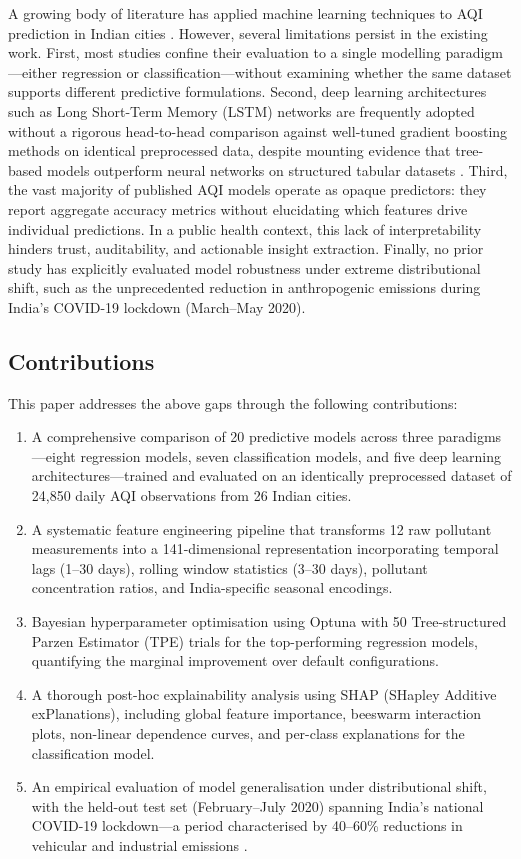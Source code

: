 \documentclass[conference]{IEEEtran}
\begin{document}
A growing body of literature has applied machine learning techniques to AQI prediction in Indian cities \cite{kumar2022, sharma2020, masood2023}. However, several limitations persist in the existing work. First, most studies confine their evaluation to a single modelling paradigm---either regression or classification---without examining whether the same dataset supports different predictive formulations. Second, deep learning architectures such as Long Short-Term Memory (LSTM) networks are frequently adopted without a rigorous head-to-head comparison against well-tuned gradient boosting methods on identical preprocessed data, despite mounting evidence that tree-based models outperform neural networks on structured tabular datasets \cite{grinsztajn2022}. Third, the vast majority of published AQI models operate as opaque predictors: they report aggregate accuracy metrics without elucidating which features drive individual predictions. In a public health context, this lack of interpretability hinders trust, auditability, and actionable insight extraction. Finally, no prior study has explicitly evaluated model robustness under extreme distributional shift, such as the unprecedented reduction in anthropogenic emissions during India's COVID-19 lockdown (March--May 2020).

\subsection{Contributions}

This paper addresses the above gaps through the following contributions:

\begin{enumerate}
    \item A comprehensive comparison of 20 predictive models across three paradigms---eight regression models, seven classification models, and five deep learning architectures---trained and evaluated on an identically preprocessed dataset of 24,850 daily AQI observations from 26 Indian cities.
    \item A systematic feature engineering pipeline that transforms 12 raw pollutant measurements into a 141-dimensional representation incorporating temporal lags (1--30 days), rolling window statistics (3--30 days), pollutant concentration ratios, and India-specific seasonal encodings.
    \item Bayesian hyperparameter optimisation using Optuna with 50 Tree-structured Parzen Estimator (TPE) trials for the top-performing regression models, quantifying the marginal improvement over default configurations.
    \item A thorough post-hoc explainability analysis using SHAP (SHapley Additive exPlanations), including global feature importance, beeswarm interaction plots, non-linear dependence curves, and per-class explanations for the classification model.
    \item An empirical evaluation of model generalisation under distributional shift, with the held-out test set (February--July 2020) spanning India's national COVID-19 lockdown---a period characterised by 40--60\% reductions in vehicular and industrial emissions \cite{mahato2020}.
\end{enumerate}
\end{document}
